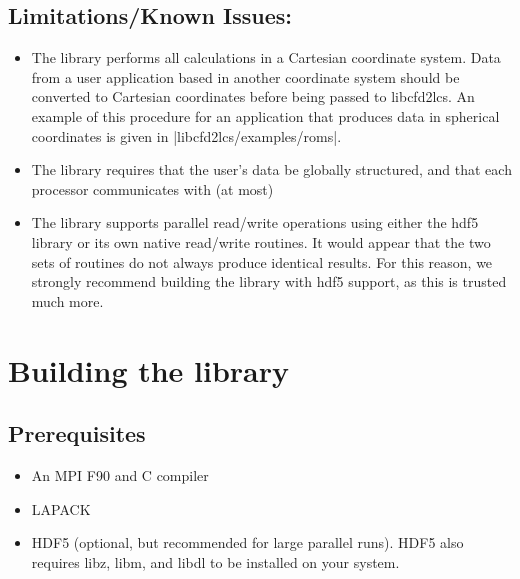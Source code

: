 \documentclass[letterpaper,11pt]{article}
\begin{document}
\subsection*{Limitations/Known Issues:}
\begin{itemize}
 \item The library performs all calculations in a Cartesian coordinate system.  Data from a user application based in another coordinate system should be converted to Cartesian coordinates before being passed to libcfd2lcs.  An example of this procedure for an application that produces data in spherical coordinates is given in \spverb|libcfd2lcs/examples/roms|.
 \item The library requires that the user's data be globally structured, and that each processor communicates with (at most) 
 \item The library supports parallel read/write operations using either the hdf5 library or its own native read/write routines.  It would appear that the two sets of routines do not always produce identical results.  For this reason, we strongly recommend building the library with hdf5 support, as this is trusted much more.
\end{itemize}

\section{Building the library}
\subsection*{Prerequisites}
\begin{itemize}
\item An MPI F90 and C compiler
\item LAPACK
\item HDF5 (optional, but recommended for large parallel runs).  HDF5 also requires libz, libm, and libdl to be installed on your system.
\end{itemize}
\end{document}
